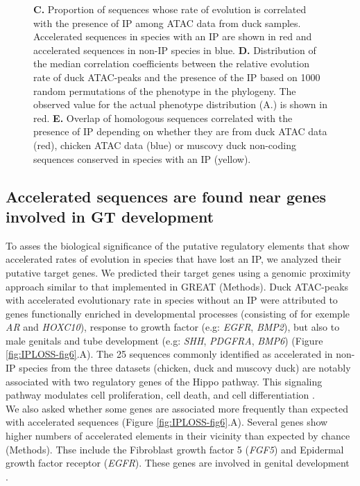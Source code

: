 \begin{figure}[hbt!]
{ \textbf{C.} Proportion of sequences whose rate of evolution is correlated with the presence of IP among ATAC data from duck samples. Accelerated sequences in species with an IP are shown in red and accelerated sequences in non-IP species in blue.
 \textbf{D.} Distribution of the median correlation coefficients between the relative evolution rate of duck ATAC-peaks and the presence of the IP based on 1000 random permutations of the phenotype in the phylogeny. The observed value for the actual phenotype distribution (A.) is shown in red. 
 \textbf{E.} Overlap of homologous sequences correlated with the presence of IP depending on whether they are from duck ATAC data (red), chicken ATAC data (blue) or muscovy duck non-coding sequences conserved in species with an IP (yellow). \\
 }
 \label{fig:IPLOSS-fig5}
\end{figure} 

\subsection{Accelerated sequences are found near genes involved in GT development}
To asses the biological significance of the putative regulatory elements that show accelerated rates of evolution in species that have lost an IP, we analyzed their putative target genes. 
We predicted their target genes using a genomic proximity approach similar to that implemented in GREAT \citep{mclean_great_2010} (Methods). Duck ATAC-peaks with accelerated evolutionary rate in species without an IP were attributed to genes functionally enriched in developmental processes (consisting of for exemple \textit{AR} and \textit{HOXC10}), response to growth factor (e.g: \textit{EGFR}, \textit{BMP2}), but also to male genitals and tube development (e.g: \textit{SHH}, \textit{PDGFRA}, \textit{BMP6}) (Figure \ref{fig:IPLOSS-fig6}.A). The 25 sequences commonly identified as accelerated in non-IP species from the three datasets (chicken, duck and muscovy duck) are notably associated with two regulatory genes of the Hippo pathway. This signaling pathway modulates cell proliferation, cell death, and cell differentiation \citep{yu_hippo_2013}. \\

We also asked whether some genes are associated more frequently than expected with accelerated sequences (Figure \ref{fig:IPLOSS-fig6}.A). Several genes show higher numbers of accelerated elements in their vicinity than expected by chance (Methods). Thse include the Fibroblast growth factor 5 (\textit{FGF5}) and Epidermal growth factor receptor (\textit{EGFR}). These genes are involved in genital development \citep{ogino_external_2001, harada_tissue-specific_2015}. 

